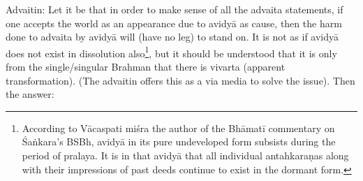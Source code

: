 \vskip 4pt

Advaitin: Let it be that in order to make sense of all the advaita statements, if one accepts the world as an appearance due to avidyā as cause, then the harm done to advaita by avidyā will (have no leg) to stand on. It is not as if avidyā does not exist in dissolution also\footnote{According to Vācaspati miśra the author of the Bhāmatī commentary on Śaṅkara’s BSBh, avidyā in its pure undeveloped form subsists during the period of pralaya. It is in that avidyā that all individual antahkaraṇas along with their impressions of past deeds continue to exist in the dormant form.}, but it should be understood that it is only from the single/singular Brahman that there is vivarta (apparent transformation). (The advaitin offers this as a via media to solve the issue). Then the answer:

\vskip 4pt

